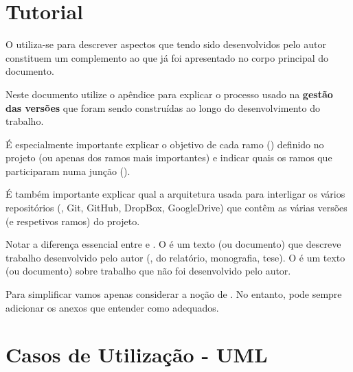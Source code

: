 



\chapter{Tutorial}
\label{ch:umDetalheAdicional}

O  utiliza-se para descrever aspectos que tendo sido desenvolvidos pelo autor constituem um complemento ao que já foi apresentado no corpo principal do documento.

Neste documento utilize o apêndice para explicar o processo usado na \textbf{gestão das versões} que foram sendo construídas ao longo do desenvolvimento do trabalho.

É especialmente importante explicar o objetivo de cada ramo () definido no projeto (ou apenas dos ramos mais importantes) e indicar quais os ramos que participaram numa junção ().

É também importante explicar qual a arquitetura usada para interligar os vários repositórios (\eg, Git, GitHub, DropBox, GoogleDrive) que contêm as várias versões (e respetivos ramos) do projeto.


Notar a diferença essencial entre  e . O  é um texto (ou documento) que descreve trabalho desenvolvido pelo autor (\eg, do relatório, monografia, tese). O  é um texto (ou documento) sobre trabalho que não foi desenvolvido pelo autor.

Para simplificar vamos apenas considerar a noção de . No entanto, pode sempre adicionar os anexos que entender como adequados.






\chapter{Casos de Utilização - UML}
\label{ch:casosUtilizacaoUml}

